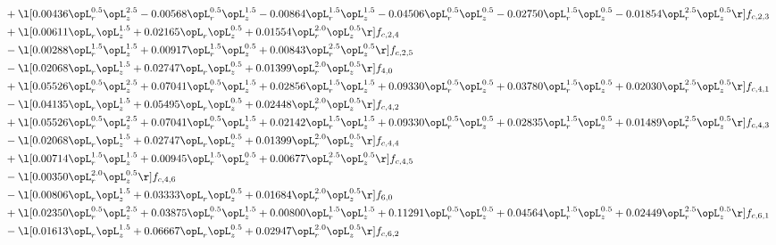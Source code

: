 \begin{alignat}{2}
& + \l[  0.00436 \opL_r^{0.5} \opL_z^{2.5}   -0.00568 \opL_r^{0.5} \opL_z^{1.5}   -0.00864 \opL_r^{1.5} \opL_z^{1.5}   -0.04506 \opL_r^{0.5} \opL_z^{0.5}   -0.02750 \opL_r^{1.5} \opL_z^{0.5}   -0.01854 \opL_r^{2.5} \opL_z^{0.5}  \r] f_{c,2,3} \nonumber \\ 
& + \l[  0.00611 \opL_r \opL_z^{1.5} +  0.02165 \opL_r \opL_z^{0.5} +  0.01554 \opL_r^{2.0} \opL_z^{0.5}  \r] f_{c,2,4} \nonumber \\ 
& - \l[  0.00288 \opL_r^{1.5} \opL_z^{1.5} +  0.00917 \opL_r^{1.5} \opL_z^{0.5} +  0.00843 \opL_r^{2.5} \opL_z^{0.5}  \r] f_{c,2,5} \nonumber \\ 
& - \l[  0.02068 \opL_r \opL_z^{1.5} +  0.02747 \opL_r \opL_z^{0.5} +  0.01399 \opL_r^{2.0} \opL_z^{0.5}  \r] f_{4,0} \nonumber \\ 
& + \l[  0.05526 \opL_r^{0.5} \opL_z^{2.5} +  0.07041 \opL_r^{0.5} \opL_z^{1.5} +  0.02856 \opL_r^{1.5} \opL_z^{1.5} +  0.09330 \opL_r^{0.5} \opL_z^{0.5} +  0.03780 \opL_r^{1.5} \opL_z^{0.5} +  0.02030 \opL_r^{2.5} \opL_z^{0.5}  \r] f_{c,4,1} \nonumber \\ 
& - \l[  0.04135 \opL_r \opL_z^{1.5} +  0.05495 \opL_r \opL_z^{0.5} +  0.02448 \opL_r^{2.0} \opL_z^{0.5}  \r] f_{c,4,2} \nonumber \\ 
& + \l[  0.05526 \opL_r^{0.5} \opL_z^{2.5} +  0.07041 \opL_r^{0.5} \opL_z^{1.5} +  0.02142 \opL_r^{1.5} \opL_z^{1.5} +  0.09330 \opL_r^{0.5} \opL_z^{0.5} +  0.02835 \opL_r^{1.5} \opL_z^{0.5} +  0.01489 \opL_r^{2.5} \opL_z^{0.5}  \r] f_{c,4,3} \nonumber \\ 
& - \l[  0.02068 \opL_r \opL_z^{1.5} +  0.02747 \opL_r \opL_z^{0.5} +  0.01399 \opL_r^{2.0} \opL_z^{0.5}  \r] f_{c,4,4} \nonumber \\ 
& + \l[  0.00714 \opL_r^{1.5} \opL_z^{1.5} +  0.00945 \opL_r^{1.5} \opL_z^{0.5} +  0.00677 \opL_r^{2.5} \opL_z^{0.5}  \r] f_{c,4,5} \nonumber \\ 
& - \l[  0.00350 \opL_r^{2.0} \opL_z^{0.5}  \r] f_{c,4,6} \nonumber \\ 
& - \l[  0.00806 \opL_r \opL_z^{1.5} +  0.03333 \opL_r \opL_z^{0.5} +  0.01684 \opL_r^{2.0} \opL_z^{0.5}  \r] f_{6,0} \nonumber \\ 
& + \l[  0.02350 \opL_r^{0.5} \opL_z^{2.5} +  0.03875 \opL_r^{0.5} \opL_z^{1.5} +  0.00800 \opL_r^{1.5} \opL_z^{1.5} +  0.11291 \opL_r^{0.5} \opL_z^{0.5} +  0.04564 \opL_r^{1.5} \opL_z^{0.5} +  0.02449 \opL_r^{2.5} \opL_z^{0.5}  \r] f_{c,6,1} \nonumber \\ 
& - \l[  0.01613 \opL_r \opL_z^{1.5} +  0.06667 \opL_r \opL_z^{0.5} +  0.02947 \opL_r^{2.0} \opL_z^{0.5}  \r] f_{c,6,2} \nonumber \\ 

\end{alignat}
